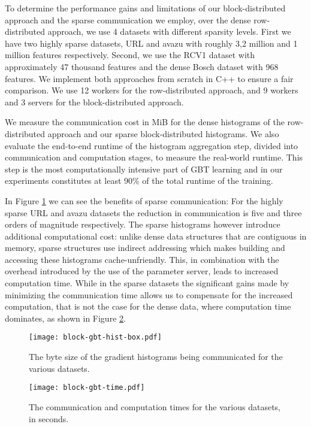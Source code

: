 To determine the performance gains and limitations of our block-distributed approach and
the sparse communication we employ, over the dense row-distributed approach,
we use 4 datasets with different sparsity levels. First
we have two highly sparse datasets, URL and avazu with roughly 3,2 million and
1 million features respectively. Second, we use the RCV1 dataset with approximately
47 thousand features and the dense Bosch dataset with 968 features.
We implement both approaches from scratch in C++ to ensure a fair comparison.
We use 12 workers for the row-distributed approach, and 9 workers and 3
servers for the block-distributed approach.

We measure the
communication cost in MiB for the dense histograms of the row-distributed approach
and our sparse block-distributed histograms. We also evaluate the end-to-end runtime
of the histogram aggregation step, divided into communication and computation stages,
to measure the real-world runtime. This step is the most computationally intensive
part of GBT learning \cite{comm-efficient-gbt} and in our experiments constitutes
at least 90\% of the total runtime of the training.

In Figure \ref{fig:block-gbt-hist-size} we can see the benefits of sparse communication:
For the highly sparse URL and avazu datasets the reduction in communication is five and
three orders of magnitude respectively. The sparse histograms however introduce additional computational
cost: unlike dense data structures that are contiguous in memory, sparse structures use
indirect addressing which makes building and accessing these histograms cache-unfriendly.
This, in combination with the overhead introduced by the use of the parameter server,
leads to increased computation time.
While in the sparse datasets the significant gains made by minimizing the communication time
allows us to compensate for the increased computation, that is not the case for
the dense data, where computation time dominates, as shown in Figure \ref{fig:block-gbt-time}.


\begin{figure}
	\centering
	\texttt{[image: block-gbt-hist-box.pdf]}
	\vspace{-10pt}
	\caption{The byte size of the gradient histograms being communicated for the various datasets.}
	\label{fig:block-gbt-hist-size}
\end{figure}

\begin{figure}
	\centering
	\texttt{[image: block-gbt-time.pdf]}
	\vspace{-10pt}
	\caption{The communication and computation times for the various datasets, in seconds.}
	\label{fig:block-gbt-time}
\end{figure}


